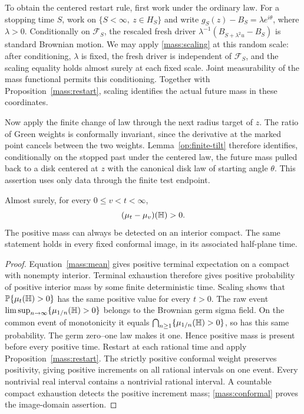 To obtain the centered restart rule, first work under the ordinary law.
For a stopping time $S$, work on $\{S<\infty,\ z\in H_S\}$ and write
$g_S(z)-B_S=\lambda e^{i\theta}$, where $\lambda>0$.
Conditionally on $\mathcal F_S$, the rescaled fresh driver
$\lambda^{-1}(B_{S+\lambda^2u}-B_S)$ is standard Brownian motion.
We may apply \eqref{mass:scaling} at this random scale: after conditioning,
$\lambda$ is fixed, the fresh driver is independent of $\mathcal F_S$,
and the scaling equality holds almost surely at each fixed scale.
Joint measurability of the mass functional permits this conditioning.
Together with Proposition~\ref{mass:restart}, scaling identifies the
actual future mass in these coordinates.

Now apply the finite change of law through the next radius target of
$z$.  The ratio of Green weights is conformally invariant, since the
derivative at the marked point cancels between the two weights.
Lemma~\ref{op:finite-tilt} therefore identifies, conditionally on the
stopped past under the centered law, the future mass pulled back to a
disk centered at $z$ with the canonical disk law of starting angle
$\theta$.  This assertion uses only data through the finite test endpoint.

\begin{proposition}
\label{mass:positive}
Almost surely, for every \mbox{$0\le v<t<\infty$},
\[
 (\mu_t-\mu_v)(\mathbb H)>0.
\]
The positive mass can always be detected on an interior compact.  The
same statement holds in every fixed conformal image, in its associated
half-plane time.
\end{proposition}

\begin{proof}
Equation~\eqref{mass:mean} gives positive terminal expectation on a
compact with nonempty interior.  Terminal exhaustion therefore gives
positive probability of positive interior mass by some finite
deterministic time.  Scaling shows that
$\mathbb P\{\mu_t(\mathbb H)>0\}$ has the same positive value for every $t>0$.
The raw event $\limsup_{n\to\infty}\{\mu_{1/n}(\mathbb H)>0\}$ belongs
to the Brownian germ sigma field. On the common event of monotonicity it
equals $\bigcap_{n\ge1}\{\mu_{1/n}(\mathbb H)>0\}$, so has this same
probability. The germ zero--one law
makes it one.  Hence positive mass is present before every positive time.
Restart at each rational time and apply
Proposition~\ref{mass:restart}.  The strictly positive conformal weight
preserves positivity, giving positive increments on all rational
intervals on one event.  Every nontrivial real interval contains a
nontrivial rational interval.  A countable compact exhaustion detects
the positive increment mass; \eqref{mass:conformal} proves the image-domain
assertion.
\end{proof}
